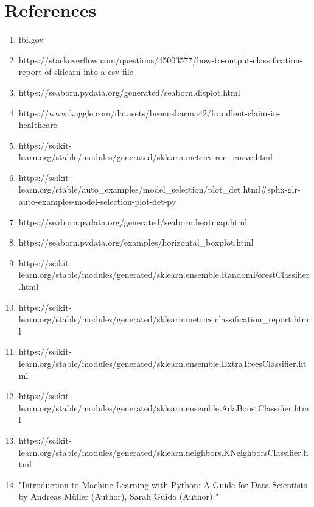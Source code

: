 \documentclass[twoside,11pt]{article}
\begin{document}
\section{References}
\begin{enumerate}[noitemsep]
  \item fbi.gov
  \item https://stackoverflow.com/questions/45003577/how-to-output-classification-report-of-sklearn-into-a-csv-file
  \item https://seaborn.pydata.org/generated/seaborn.displot.html
  \item https://www.kaggle.com/datasets/beenusharma42/fraudlent-claim-in-healthcare
  \item https://scikit-learn.org/stable/modules/generated/sklearn.metrics.roc\_curve.html
  \item https://scikit-learn.org/stable/auto\_examples/model\_selection/plot\_det.html\#sphx-glr-auto-examples-model-selection-plot-det-py
  \item https://seaborn.pydata.org/generated/seaborn.heatmap.html
  \item https://seaborn.pydata.org/examples/horizontal\_boxplot.html
  \item https://scikit-learn.org/stable/modules/generated/sklearn.ensemble.RandomForestClassifier.html
  \item https://scikit-learn.org/stable/modules/generated/sklearn.metrics.classification\_report.html
  \item https://scikit-learn.org/stable/modules/generated/sklearn.ensemble.ExtraTreesClassifier.html
  \item https://scikit-learn.org/stable/modules/generated/sklearn.ensemble.AdaBoostClassifier.html
  \item https://scikit-learn.org/stable/modules/generated/sklearn.neighbors.KNeighborsClassifier.html
  \item "Introduction to Machine Learning with Python: A Guide for Data Scientists by Andreas Müller (Author), Sarah Guido (Author) "


\end{enumerate}
\end{document}
